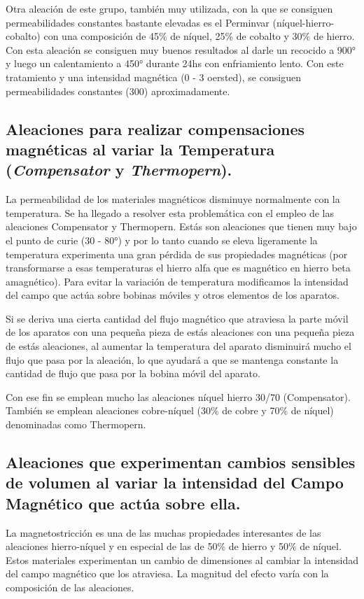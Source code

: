 \documentclass[12pt,a4paper]{article}
\begin{document}
Otra aleación de este grupo, también muy utilizada, con la que se consiguen permeabilidades constantes bastante elevadas es el Perminvar (níquel-hierro-cobalto) con una composición de 45\% de níquel, 25\% de cobalto y 30\% de hierro. Con esta aleación se consiguen muy buenos resultados al darle un recocido a 900° y luego un calentamiento a 450° durante 24hs con enfriamiento lento. Con este tratamiento y una intensidad magnética (0 - 3 oersted), se consiguen permeabilidades constantes (300) aproximadamente.

\subsection{Aleaciones para realizar compensaciones magnéticas al variar la Temperatura (\textit{Compensator} y \textit{Thermopern}).}

La permeabilidad de los materiales magnéticos disminuye normalmente con la temperatura. Se ha llegado a resolver esta problemática con el empleo de las aleaciones Compensator y Thermopern. Estás son aleaciones que tienen muy bajo el punto de curie (30 - 80°) y por lo tanto cuando se eleva ligeramente la temperatura experimenta una gran pérdida de sus propiedades magnéticas (por transformarse a esas temperaturas el hierro alfa que es magnético en hierro beta amagnético). Para evitar la variación de temperatura modificamos la intensidad del campo que actúa sobre bobinas móviles y otros elementos de los aparatos.

Si se deriva una cierta cantidad del flujo magnético que atraviesa la parte móvil de los aparatos con una pequeña pieza de estás aleaciones con una pequeña pieza de estás aleaciones, al aumentar la temperatura del aparato disminuirá mucho el flujo que pasa por la aleación, lo que ayudará a que se mantenga constante la cantidad de flujo que pasa por la bobina móvil del aparato.

Con ese fin se emplean mucho las aleaciones níquel hierro 30/70 (Compensator). También se emplean aleaciones cobre-níquel (30\% de cobre y 70\% de níquel) denominadas como Thermopern.

\subsection{Aleaciones que experimentan cambios sensibles de volumen al variar la intensidad del Campo Magnético que actúa sobre ella.}

La magnetostricción es una de las muchas propiedades interesantes de las aleaciones hierro-níquel y en especial de las de 50\% de hierro y 50\% de níquel. Estos materiales experimentan un cambio de dimensiones al cambiar la intensidad del campo magnético que los atraviesa. La magnitud del efecto varía con la composición de las aleaciones.
\end{document}
